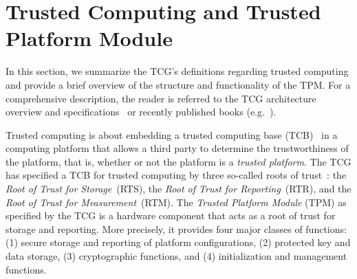 \documentclass[runningheads]{llncs}
\begin{document}


\section{Trusted Computing and Trusted Platform Module}\label{sec:background}
In this section, we summarize the TCG's definitions regarding trusted
computing and provide a brief overview of the structure and functionality of
the TPM. For a comprehensive description, the reader is referred to the TCG
architecture overview and specifications~\cite{TCGArch,TPM} or
recently published books (e.g.~\cite{Mitchell2005}).

Trusted computing is about embedding a trusted computing base
(TCB)~\cite{Bishop2003} in a computing platform that allows a third party
to determine the trustworthiness of the platform, that is, whether or not
the platform is a \emph{trusted platform}.
The TCG has specified a TCB for trusted computing by three so-called roots
of trust~\cite{TCGArch}: the \emph{Root of Trust for Storage}~(RTS), the
\emph{Root of Trust for Reporting}~(RTR), and the \emph{Root of Trust for
Measurement}~(RTM). The \emph{Trusted Platform
Module} (TPM) as specified by the TCG is a hardware component that acts as a
root of trust for storage and reporting. More precisely, it provides four
major classes of functions: (1) secure storage and reporting of platform
configurations, (2) protected key and data storage, (3) cryptographic
functions, and (4) initialization and management functions.
\end{document}
